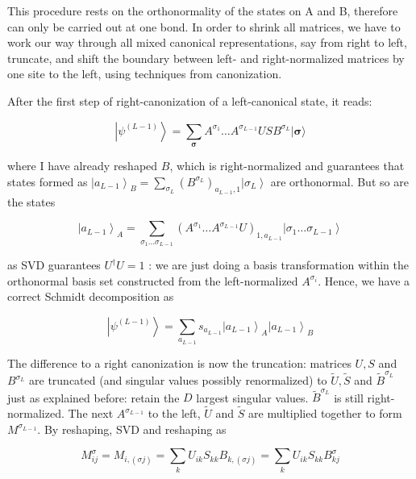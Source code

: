 \documentclass[12pt]{article}
\begin{document}
This procedure rests on the orthonormality of the states on A and B, therefore can only be carried out at one bond. In order to shrink all matrices, we have to work our way through all mixed canonical representations, say from right to left, truncate, and shift the boundary between left- and right-normalized matrices by one site to the left, using techniques from canonization.

After the first step of right-canonization of a left-canonical state, it reads:


\begin{equation*}
\left|\psi^{(L-1)}\right\rangle=\sum_{\boldsymbol{\sigma}} A^{\sigma_{1}} \ldots A^{\sigma_{L-1}} U S B^{\sigma_{L}}|\boldsymbol{\sigma}\rangle \tag{139}
\end{equation*}


where I have already reshaped $B$, which is right-normalized and guarantees that states formed as $\left|a_{L-1}\right\rangle_{B}=\sum_{\sigma_{L}}\left(B^{\sigma_{L}}\right)_{a_{L-1}, 1}\left|\sigma_{L}\right\rangle$ are orthonormal. But so are the states


\begin{equation*}
\left|a_{L-1}\right\rangle_{A}=\sum_{\sigma_{1} \ldots \sigma_{L-1}}\left(A^{\sigma_{1}} \ldots A^{\sigma_{L-1}} U\right)_{1, a_{L-1}}\left|\sigma_{1} \ldots \sigma_{L-1}\right\rangle \tag{140}
\end{equation*}


as SVD guarantees $U^{\dagger} U=1$ : we are just doing a basis transformation within the orthonormal basis set constructed from the left-normalized $A^{\sigma_{i}}$. Hence, we have a correct Schmidt decomposition as


\begin{equation*}
\left|\psi^{(L-1)}\right\rangle=\sum_{a_{L-1}} s_{a_{L-1}}\left|a_{L-1}\right\rangle_{A}\left|a_{L-1}\right\rangle_{B} \tag{141}
\end{equation*}


The difference to a right canonization is now the truncation: matrices $U, S$ and $B^{\sigma_{L}}$ are truncated (and singular values possibly renormalized) to $\tilde{U}, \tilde{S}$ and $\tilde{B}^{\sigma_{L}}$ just as explained before: retain the $D$ largest singular values. $\tilde{B}^{\sigma_{L}}$ is still right-normalized. The next $A^{\sigma_{L-1}}$ to the left, $\tilde{U}$ and $\tilde{S}$ are multiplied together to form $M^{\sigma_{L-1}}$. By reshaping, SVD and reshaping as


\begin{equation*}
M_{i j}^{\sigma}=M_{i,(\sigma j)}=\sum_{k} U_{i k} S_{k k} B_{k,(\sigma j)}=\sum_{k} U_{i k} S_{k k} B_{k j}^{\sigma} \tag{142}
\end{equation*}
\end{document}
